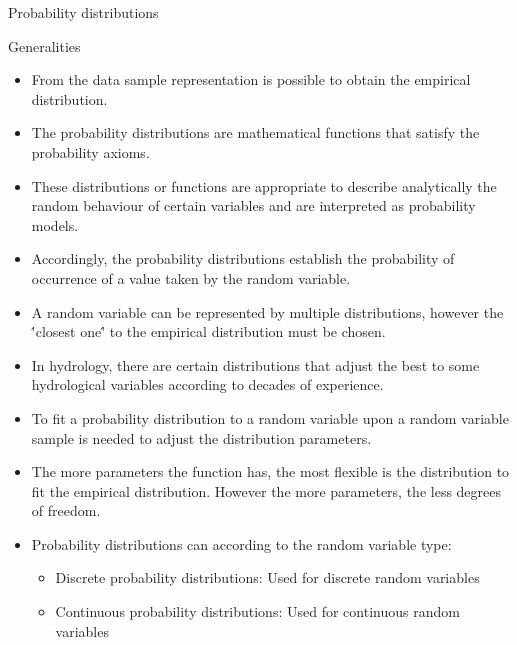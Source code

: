 \documentclass[8pt]{beamer}
\begin{document}
\begin{frame}{Probability distributions}
    \begin{block}{Generalities}
        \begin{itemize}
            \item From the data sample representation is possible to obtain the \alert{empirical distribution}. 
            \item The \alert{probability distributions} are mathematical functions that satisfy the probability axioms. 
            \item These distributions or functions are appropriate to describe analytically the random behaviour of certain variables and are interpreted as probability models. 
            \item Accordingly, the probability distributions establish the probability of occurrence of a value taken by the random variable. 
            \item A random variable can be represented by multiple distributions, however the \''closest one\'' to the empirical distribution  must be chosen. 
            \item In hydrology, there are certain distributions that adjust the best to some hydrological variables according to decades of experience. 
            \item To fit a probability distribution to a random variable upon a random variable sample is needed to adjust the distribution \alert{parameters}.
            \item The more parameters the function has, the most flexible is the distribution to fit the empirical distribution. However the more parameters, the less degrees of freedom.
            \item Probability distributions can according to the random variable type:
                \begin{itemize}
                    \item Discrete probability distributions: Used for discrete random variables
                    \item Continuous probability distributions: Used for continuous random variables
                \end{itemize}
        \end{itemize}
    \end{block}

\end{frame}
\end{document}
